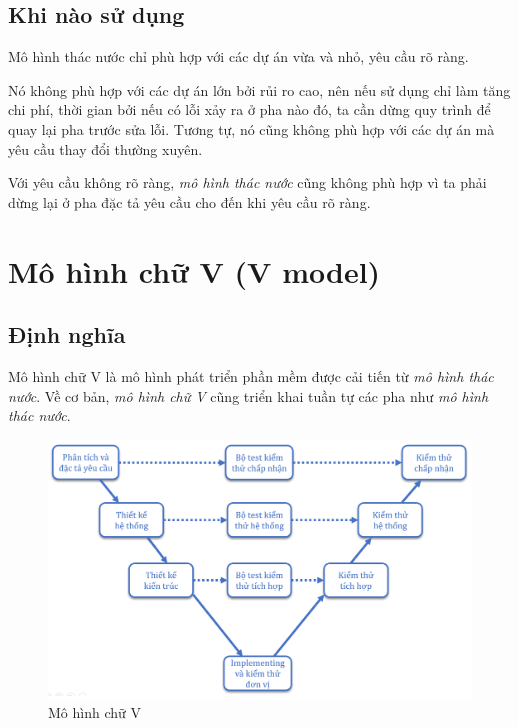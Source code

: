 \documentclass[14pt]{extarticle}
\begin{document}
\subsection{Khi nào sử dụng}
Mô hình thác nước chỉ phù hợp với các dự án vừa và nhỏ, yêu cầu rõ ràng.

Nó không phù hợp với các dự án lớn bởi rủi ro cao, nên nếu sử dụng chỉ làm tăng
chi phí, thời gian bởi nếu có lỗi xảy ra ở pha nào đó, ta cần dừng quy trình để
quay lại pha trước sửa lỗi. Tương tự, nó cũng không phù hợp với các dự án mà
yêu cầu thay đổi thường xuyên.

Với yêu cầu không rõ ràng, \textit{mô hình thác nước} cũng không phù hợp vì ta phải
dừng lại ở pha đặc tả yêu cầu cho đến khi yêu cầu rõ ràng.



\newpage
\section{Mô hình chữ V (V model)}
\subsection{Định nghĩa}
Mô hình chữ V là mô hình phát triển phần mềm được cải tiến từ
\textit{mô hình thác nước}. Về cơ bản, \textit{mô hình chữ V} cũng triển khai tuần tự
các pha như \textit{mô hình thác nước}.
\begin{figure}[h]
  \centering
  \includegraphics[width=\textwidth]{v-model.png}
  \caption{Mô hình chữ V}
  \label{fig:v-model}
\end{figure}
\end{document}
